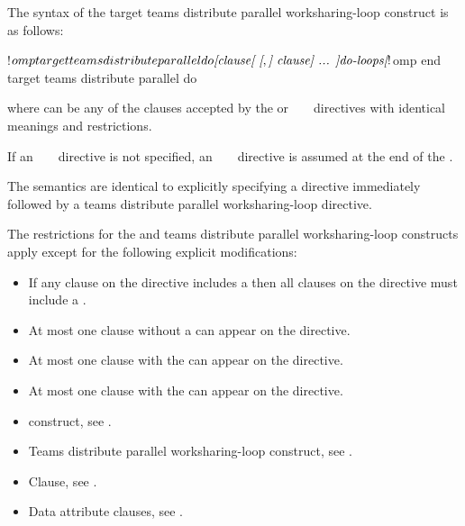 \begin{fortranspecific}
The syntax of the target teams distribute parallel worksharing-loop construct 
is as follows:

\begin{ompfPragma}
!$omp target teams distribute parallel do \plc{[clause[ [},\plc{] clause] ... ]}
    \plc{do-loops}
\plc{[}!$omp end target teams distribute parallel do\plc{]}
\end{ompfPragma}

where  can be any of the clauses accepted by the  or
~ ~ directives with
identical meanings and restrictions.

If an ~   
~ directive is not specified, an ~
  ~ directive is assumed at 
the end of the .
\end{fortranspecific}

\descr
The semantics are identical to explicitly specifying a 
directive immediately followed by a teams distribute parallel worksharing-loop 
directive.

\restrictions
The restrictions for the  and teams distribute parallel
worksharing-loop constructs apply except for the following explicit modifications:

\begin{itemize}
\item If any  clause on the directive includes a
       then all  clauses
      on the directive must include a .
\item At most one  clause without a
       can appear on the directive.
\item At most one  clause with the 
       can appear on the directive.
\item At most one  clause with the 
       can appear on the directive.
\end{itemize}

\crossreferences
\begin{itemize}
\item {} construct, see .

\item Teams distribute parallel worksharing-loop construct, see
.

\item {} Clause, see .

\item Data attribute clauses, see
.
\end{itemize}



